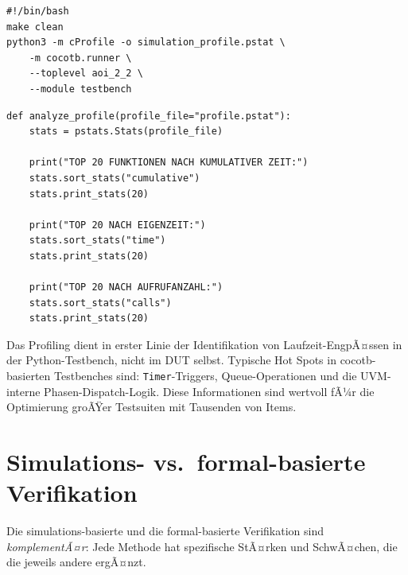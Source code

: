 ﻿\documentclass[12pt,a4paper]{report}
\begin{document}
\begin{lstlisting}[style=bashstyle, caption={Simulations-Profiling mit cProfile}]
#!/bin/bash
make clean
python3 -m cProfile -o simulation_profile.pstat \
    -m cocotb.runner \
    --toplevel aoi_2_2 \
    --module testbench
\end{lstlisting}

\begin{lstlisting}[style=pythonstyle, caption={\texttt{analyze\_profile.py}: Auswertung der Profil-Daten}]
def analyze_profile(profile_file="profile.pstat"):
    stats = pstats.Stats(profile_file)

    print("TOP 20 FUNKTIONEN NACH KUMULATIVER ZEIT:")
    stats.sort_stats("cumulative")
    stats.print_stats(20)

    print("TOP 20 NACH EIGENZEIT:")
    stats.sort_stats("time")
    stats.print_stats(20)

    print("TOP 20 NACH AUFRUFANZAHL:")
    stats.sort_stats("calls")
    stats.print_stats(20)
\end{lstlisting}

Das Profiling dient in erster Linie der Identifikation von Laufzeit-EngpÃ¤ssen
in der Python-Testbench, nicht im DUT selbst. Typische Hot Spots in cocotb-
basierten Testbenches sind: \texttt{Timer}-Triggers, Queue-Operationen und
die UVM-interne Phasen-Dispatch-Logik. Diese Informationen sind wertvoll fÃ¼r
die Optimierung groÃŸer Testsuiten mit Tausenden von Items.

\section{Simulations- vs.\ formal-basierte Verifikation}
\label{subsec:vergleich_sim_formal}

Die simulations-basierte und die formal-basierte Verifikation sind \emph{komplementÃ¤r}:
Jede Methode hat spezifische StÃ¤rken und SchwÃ¤chen, die die jeweils andere ergÃ¤nzt.
\end{document}
